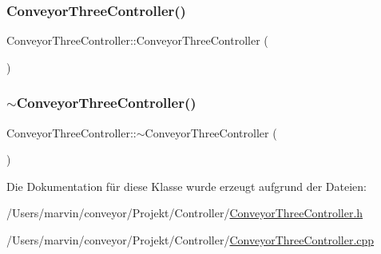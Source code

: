 \subsubsection{\texorpdfstring{Conveyor\+Three\+Controller()}{ConveyorThreeController()}}
{\footnotesize\ttfamily Conveyor\+Three\+Controller\+::\+Conveyor\+Three\+Controller (\begin{DoxyParamCaption}{ }\end{DoxyParamCaption})}

\hypertarget{class_conveyor_three_controller_a3ea9a30cb49da76384b3633d11240c92}{}\label{class_conveyor_three_controller_a3ea9a30cb49da76384b3633d11240c92} 
\subsubsection{\texorpdfstring{$\sim$\+Conveyor\+Three\+Controller()}{~ConveyorThreeController()}}
{\footnotesize\ttfamily Conveyor\+Three\+Controller\+::$\sim$\+Conveyor\+Three\+Controller (\begin{DoxyParamCaption}{ }\end{DoxyParamCaption})\hspace{0.3cm}{\ttfamily [virtual]}}



Die Dokumentation für diese Klasse wurde erzeugt aufgrund der Dateien\+:\begin{DoxyCompactItemize}
\item 
/\+Users/marvin/conveyor/\+Projekt/\+Controller/\hyperlink{_conveyor_three_controller_8h}{Conveyor\+Three\+Controller.\+h}\item 
/\+Users/marvin/conveyor/\+Projekt/\+Controller/\hyperlink{_conveyor_three_controller_8cpp}{Conveyor\+Three\+Controller.\+cpp}\end{DoxyCompactItemize}
